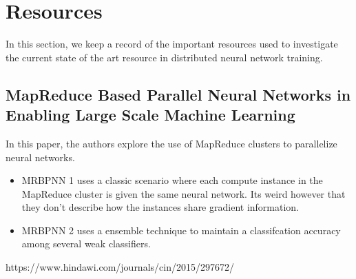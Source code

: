 \documentclass{article}
\begin{document}
\section{Resources}

In this section, we keep a record of the important resources used to investigate the current state of the art resource in distributed neural network training.

\subsection{MapReduce Based Parallel Neural Networks in Enabling Large Scale Machine Learning}

In this paper, the authors explore the use of MapReduce clusters to parallelize neural networks.

\begin{itemize}

    \item MRBPNN 1 uses a classic scenario where each compute instance in the MapReduce cluster is given the same neural network. Its weird however that they don't describe how the instances share gradient information.

    \item MRBPNN 2 uses a ensemble technique to maintain a classifcation accuracy among several weak classifiers.
    
\end{itemize}


https://www.hindawi.com/journals/cin/2015/297672/
\end{document}
